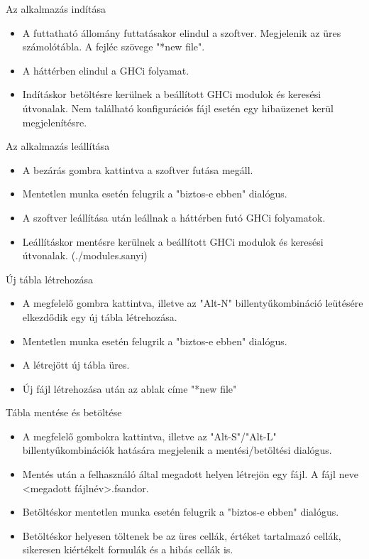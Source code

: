 \begin{compactenum}
	\item Az alkalmazás indítása
	\begin{itemize}
		\item A futtatható állomány futtatásakor elindul a szoftver. Megjelenik az üres számolótábla. A fejléc szövege "*new file".
		\item A háttérben elindul a GHCi folyamat.
		\item Indításkor betöltésre kerülnek a beállított GHCi modulok és keresési útvonalak. Nem található konfigurációs fájl esetén egy hibaüzenet kerül megjelenítésre.
	\end{itemize}
	\item Az alkalmazás leállítása
	\begin{itemize}
		\item A bezárás gombra kattintva a szoftver futása megáll.
		\item Mentetlen munka esetén felugrik a "biztos-e ebben" dialógus.
		\item A szoftver leállítása után leállnak a háttérben futó GHCi folyamatok.
		\item Leállításkor mentésre kerülnek a beállított GHCi modulok és keresési útvonalak. (./modules.sanyi)
	\end{itemize}
	\item Új tábla létrehozása
	\begin{itemize}
		\item A megfelelő gombra kattintva, illetve az "Alt-N" billentyűkombináció leütésére elkezdődik egy új tábla létrehozása.
		\item Mentetlen munka esetén felugrik a "biztos-e ebben" dialógus.
		\item A létrejött új tábla üres.
		\item Új fájl létrehozása után az ablak címe "*new file"	
	\end{itemize}
	\item Tábla mentése és betöltése
	\begin{itemize}
		\item A megfelelő gombokra kattintva, illetve az "Alt-S"/"Alt-L" billentyűkombinációk hatására megjelenik a mentési/betöltési dialógus.
		\item Mentés után a felhasználó által megadott helyen létrejön egy fájl. A fájl neve <megadott fájlnév>.fsandor.
		\item Betöltéskor mentetlen munka esetén felugrik a "biztos-e ebben" dialógus.
		\item Betöltéskor helyesen töltenek be az üres cellák, értéket tartalmazó cellák, sikeresen kiértékelt formulák és a hibás cellák is. 

\end{itemize}
\end{compactenum}
